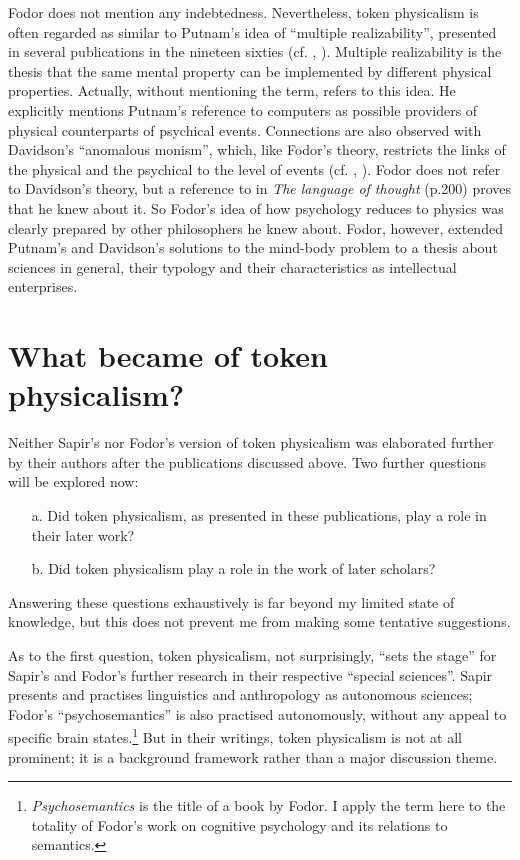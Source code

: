 \documentclass[output=paper]{langscibook}
\begin{document}
Fodor does not mention any indebtedness. Nevertheless, token physicalism is often regarded as similar to Putnam's idea of ``multiple realizability'', presented in several publications in the nineteen sixties (cf. \citealt{Putnam1960}, \citealt[xiii]{LoewerRey1991}). Multiple realizability is the thesis that the same mental property can be implemented by different physical properties. Actually, without mentioning the term, \citet[105--106]{Fodor1974} refers to this idea. He explicitly mentions Putnam's reference to computers as possible providers of physical counterparts of psychical events. Connections are also observed with Davidson's ``anomalous monism'', which, like Fodor's theory, restricts the links of the physical and the psychical to the level of events (cf. \citealt{Davidson1970}, \citealt[xxxi]{LoewerRey1991}). Fodor does not refer to Davidson's theory, but a reference to \citet{Davidson1970} in \emph{The language of thought} (p.200) proves that he knew about it. So Fodor's idea of how psychology reduces to physics was clearly prepared by other philosophers he knew about. Fodor, however, extended Putnam's and Davidson's solutions to the mind-body problem to a thesis about sciences in general, their typology and their characteristics as intellectual enterprises.

\section{What became of token physicalism?}
\label{sec:elffers:whatbecame}

Neither Sapir's nor Fodor's version of token physicalism was elaborated further by their authors after the publications discussed above. Two further questions will be explored now:

\begin{enumerate}
    \item[a.] Did token physicalism, as presented in these publications, play a role in their later work?
    \item[b.] Did token physicalism play a role in the work of later scholars?
\end{enumerate}

Answering these questions exhaustively is far beyond my limited state of knowledge, but this does not prevent me from making some tentative suggestions.

As to the first question, token physicalism, not surprisingly, ``sets the stage'' for Sapir's and Fodor's further research in their respective ``special sciences''. Sapir presents and practises linguistics and anthropology as autonomous sciences; Fodor's ``psychosemantics'' is also practised autonomously, without any appeal to specific brain states.\footnote{\emph{Psychosemantics} is the title of a \citeyear{Fodor1987} book by Fodor. I apply the term here to the totality of Fodor's work on cognitive psychology and its relations to semantics.} But in their writings, token physicalism is not at all prominent; it is a background framework rather than a major discussion theme.
\end{document}
